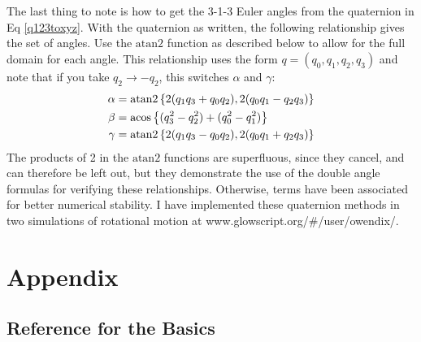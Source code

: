 \documentclass[10pt]{article}
\begin{document}
The last thing to note is how to get the 3-1-3 Euler angles from the 
quaternion in Eq \ref{q123toxyz}. With the quaternion as written, 
the following relationship gives the set of angles. Use the $\text{atan2}$ 
function as described below 
to allow for the full domain for each angle. This relationship uses 
the form $q=(q_0,q_1,q_2,q_3)$ and note that if you take 
$q_2\rightarrow-q_2$, this switches $\alpha$ and $\gamma$:
\begin{align}
    \alpha &=\text{atan2}\left\{2(q_1q_3+q_0q_2),2(q_0q_1-q_2q_3)\right\}
        \notag \\
    \beta &= \text{acos}\left\{(q_3^2 - q_2^2)+(q_0^2-q_1^2)\right\} \notag \\
    \gamma &= \text{atan2}\left\{2(q_1q_3-q_0q_2),2(q_0q_1+q_2q_3)\right\}
\end{align}
The products of 2 in the $\text{atan2}$ functions are superfluous, since 
they cancel, and can therefore be left out, but they demonstrate the use of 
the double angle formulas for verifying these relationships. Otherwise, 
terms have been associated for better numerical stability. I have 
implemented these quaternion methods in two simulations of rotational motion at 
www.glowscript.org/\#/user/owendix/.

\section{Appendix} 
\subsection{Reference for the Basics}\label{apx:ref}
\end{document}
